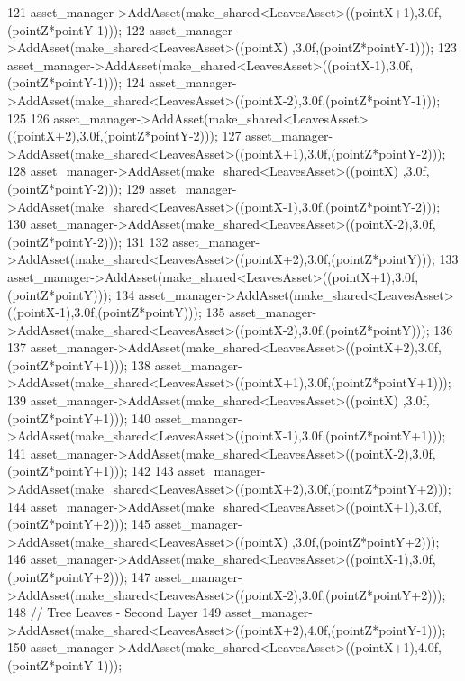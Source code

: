 \begin{DoxyCode}
121             asset\_manager->AddAsset(make\_shared<LeavesAsset>((pointX+1),3.0f,(pointZ*pointY-1)));
122             asset\_manager->AddAsset(make\_shared<LeavesAsset>((pointX)  ,3.0f,(pointZ*pointY-1)));
123             asset\_manager->AddAsset(make\_shared<LeavesAsset>((pointX-1),3.0f,(pointZ*pointY-1)));
124             asset\_manager->AddAsset(make\_shared<LeavesAsset>((pointX-2),3.0f,(pointZ*pointY-1)));
125 
126             asset\_manager->AddAsset(make\_shared<LeavesAsset>((pointX+2),3.0f,(pointZ*pointY-2)));
127             asset\_manager->AddAsset(make\_shared<LeavesAsset>((pointX+1),3.0f,(pointZ*pointY-2)));
128             asset\_manager->AddAsset(make\_shared<LeavesAsset>((pointX)  ,3.0f,(pointZ*pointY-2)));
129             asset\_manager->AddAsset(make\_shared<LeavesAsset>((pointX-1),3.0f,(pointZ*pointY-2)));
130             asset\_manager->AddAsset(make\_shared<LeavesAsset>((pointX-2),3.0f,(pointZ*pointY-2)));
131 
132             asset\_manager->AddAsset(make\_shared<LeavesAsset>((pointX+2),3.0f,(pointZ*pointY)));
133             asset\_manager->AddAsset(make\_shared<LeavesAsset>((pointX+1),3.0f,(pointZ*pointY)));
134             asset\_manager->AddAsset(make\_shared<LeavesAsset>((pointX-1),3.0f,(pointZ*pointY)));
135             asset\_manager->AddAsset(make\_shared<LeavesAsset>((pointX-2),3.0f,(pointZ*pointY))); 
136 
137             asset\_manager->AddAsset(make\_shared<LeavesAsset>((pointX+2),3.0f,(pointZ*pointY+1)));
138             asset\_manager->AddAsset(make\_shared<LeavesAsset>((pointX+1),3.0f,(pointZ*pointY+1)));
139             asset\_manager->AddAsset(make\_shared<LeavesAsset>((pointX)  ,3.0f,(pointZ*pointY+1)));
140             asset\_manager->AddAsset(make\_shared<LeavesAsset>((pointX-1),3.0f,(pointZ*pointY+1)));
141             asset\_manager->AddAsset(make\_shared<LeavesAsset>((pointX-2),3.0f,(pointZ*pointY+1)));
142  
143             asset\_manager->AddAsset(make\_shared<LeavesAsset>((pointX+2),3.0f,(pointZ*pointY+2)));
144             asset\_manager->AddAsset(make\_shared<LeavesAsset>((pointX+1),3.0f,(pointZ*pointY+2)));
145             asset\_manager->AddAsset(make\_shared<LeavesAsset>((pointX)  ,3.0f,(pointZ*pointY+2)));
146             asset\_manager->AddAsset(make\_shared<LeavesAsset>((pointX-1),3.0f,(pointZ*pointY+2)));
147             asset\_manager->AddAsset(make\_shared<LeavesAsset>((pointX-2),3.0f,(pointZ*pointY+2)));
148             \textcolor{comment}{// Tree Leaves - Second Layer}
149             asset\_manager->AddAsset(make\_shared<LeavesAsset>((pointX+2),4.0f,(pointZ*pointY-1)));
150             asset\_manager->AddAsset(make\_shared<LeavesAsset>((pointX+1),4.0f,(pointZ*pointY-1)));

\end{DoxyCode}
